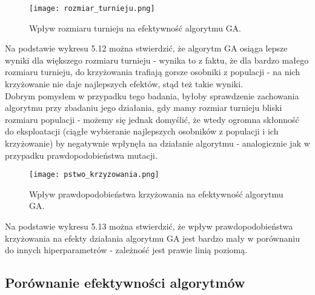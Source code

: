 \documentclass[11pt]{scrartcl} %
\begin{document}
\begin{figure}[h] %
        \centering
        \texttt{[image: rozmiar\_turnieju.png]} %
        \caption{Wpływ rozmiaru turnieju na efektywność algorytmu GA.}
\end{figure}

Na podstawie wykresu 5.12 można stwierdzić, że algorytm GA osiąga lepsze wyniki dla większego rozmiaru turnieju - wynika to z faktu, że dla bardzo małego rozmiaru turnieju, do krzyżowania trafiają gorsze osobniki z populacji - na nich krzyżowanie nie daje najlepszych efektów, stąd też takie wyniki. 
\\
Dobrym pomysłem w przypadku tego badania, byłoby sprawdzenie zachowania algorytmu przy zbadaniu jego działania, gdy mamy rozmiar turnieju bliski rozmiaru populacji - możemy się jednak domyślić, że wtedy ogromna skłonność do eksploatacji (ciągłe wybieranie najlepszych osobników z populacji i ich krzyżowanie) by negatywnie wpłynęła na działanie algorytmu - analogicznie jak w przypadku prawdopodobieństwa mutacji.\\

\begin{figure}[h] %
        \centering
        \texttt{[image: pstwo\_krzyzowania.png]} %
        \caption{Wpływ prawdopodobieństwa krzyżowania na efektywność algorytmu GA.}
\end{figure}

Na podstawie wykresu 5.13 można stwierdzić, że wpływ prawdopodobieństwa krzyżowania na efekty działania algorytmu GA jest bardzo mały w porównaniu do innych hiperparametrów - zależność jest prawie linią poziomą.\\  

\subsection{Porównanie efektywności algorytmów}
\end{document}
